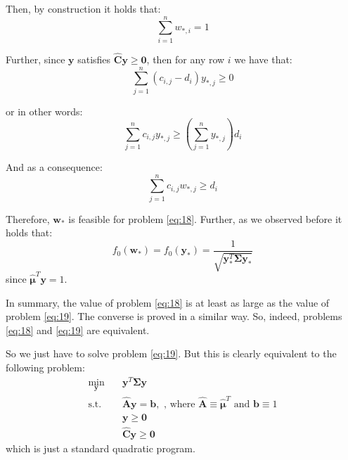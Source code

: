 \documentclass{beamer}
\begin{document}
\begin{frame}

\justifying
Then, by construction it holds that:
$$
\sum_{i=1}^{n}w_{*,i} = 1
$$

\vspace{0.4cm}
\justifying
Further, since $\mathbf{y}$ satisfies $\hat{\mathbf{C}}\mathbf{y} \geq \mathbf{0}$, then for any row $i$ we have that:
$$
\sum_{j=1}^{n} \left( c_{i,j} - d_{i} \right) y_{*,j} \geq 0
$$

\vspace{0.4cm}
\justifying
or in other words:
$$
\sum_{j=1}^{n} c_{i,j}y_{*,j} \geq \left(\sum_{j=1}^{n}y_{*,j}\right)d_{i}
$$

\vspace{0.4cm}
\justifying
And as a consequence:
$$
\sum_{j=1}^{n} c_{i,j}w_{*,j} \geq d_{i}
$$

\end{frame}




\begin{frame}

\justifying
Therefore, $\mathbf{w}_{*}$ is feasible for problem \eqref{eq:18}. Further, as we observed before it holds that:
$$
f_{0}\left(\mathbf{w}_{*}\right) = f_{0}\left(\mathbf{y}_{*}\right) = \frac{1}{\sqrt{\mathbf{y}_{*}^{T}\mathbf{\Sigma}\mathbf{y}_{*}}}
$$
since $\hat{\boldsymbol\mu}^{T}\mathbf{y} = 1$.

\vspace{0.4cm}
\justifying
In summary, the value of problem \eqref{eq:18} is at least as large as the value of problem \eqref{eq:19}. The converse is proved in a similar way. So, indeed, problems \eqref{eq:18} and  \eqref{eq:19} are equivalent.

\vspace{0.4cm}
\justifying
So we just have to solve problem \eqref{eq:19}. But this is clearly equivalent to the following problem:
\justifying
\begin{equation}
\begin{aligned}
\label{eq:20}
\min_{\mathbf{y}} \quad & \mathbf{y}^{T}\mathbf{\Sigma}\mathbf{y} \\
\textrm{s.t.} \quad & \hat{\mathbf{A}} \mathbf{y} = \mathbf{b}, \textrm{ , where } \hat{\mathbf{A}} \equiv \hat{\boldsymbol\mu}^{T} \textrm{ and } \mathbf{b} \equiv 1  \\
                             & \mathbf{y} \geq \mathbf{0} \\
                             & \hat{\mathbf{C}}\mathbf{y} \geq \mathbf{0}
\end{aligned}
\end{equation}
\justifying
which is just a standard quadratic program.

\end{frame}
\end{document}
